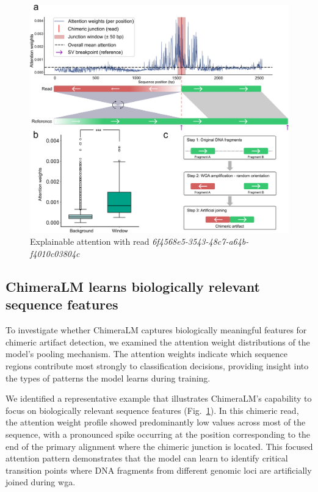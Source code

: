\documentclass[pdflatex,sn-nature]{sn-jnl}%
\theoremstyle{thmstyleone}%
\theoremstyle{thmstyletwo}%
\theoremstyle{thmstylethree}%
\begin{document}
\begin{figure}[!ht]
	\begin{center}
		\includegraphics[width=\textwidth]{final_figures/figure4}
	\end{center}
	\caption{Explainable attention with read \emph{6f4568e5-3543-48c7-a64b-f4010c03804c}}\label{fig:figure4}
\end{figure}

\subsection*{ChimeraLM learns biologically relevant sequence features}

To investigate whether ChimeraLM captures biologically meaningful features for chimeric artifact detection, we examined the attention weight distributions of the model's pooling mechanism.
The attention weights indicate which sequence regions contribute most strongly to classification decisions, providing insight into the types of patterns the model learns during training.

We identified a representative example that illustrates ChimeraLM's capability to focus on biologically relevant sequence features (Fig.~\ref{fig:figure4}).
In this chimeric read, the attention weight profile showed predominantly low values across most of the sequence, with a pronounced spike occurring at the position corresponding to the end of the primary alignment where the chimeric junction is located.
This focused attention pattern demonstrates that the model can learn to identify critical transition points where DNA fragments from different genomic loci are artificially joined during \gls{wga}.
\end{document}
